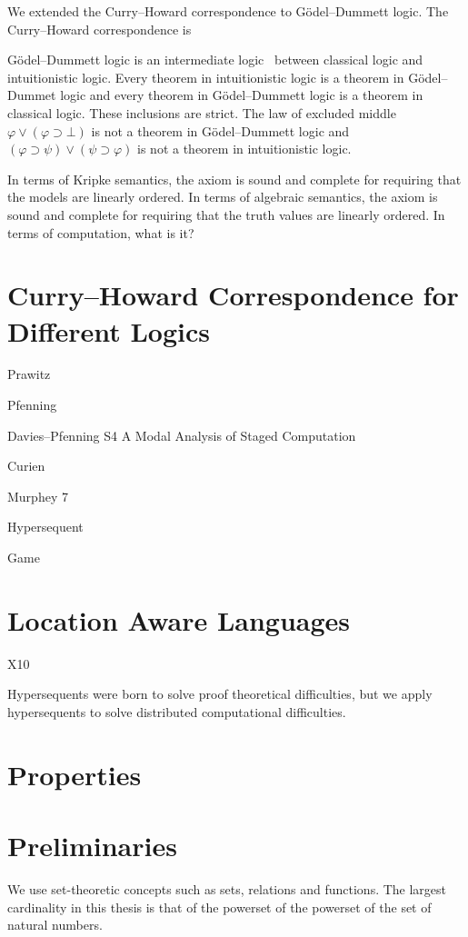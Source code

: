 We extended the Curry--Howard correspondence to G\"odel--Dummett logic.
The Curry--Howard correspondence is 

G\"odel--Dummett logic is an intermediate logic~\citep{umezawa} between
classical logic and intuitionistic logic.  Every theorem in
intuitionistic logic is a theorem in G\"odel--Dummet logic and every
theorem in G\"odel--Dummett logic is a theorem in classical logic.
These inclusions are strict.  The law of excluded middle
$\varphi\vee(\varphi\supset \bot)$ is not a theorem in G\"odel--Dummett
logic and $(\varphi\supset\psi)\vee(\psi\supset\varphi)$ is not a
theorem in intuitionistic logic.

In terms of Kripke semantics, the axiom is sound and complete for
requiring that the models are linearly ordered.
In terms of algebraic semantics, the axiom is sound and complete for
requiring that the truth values are linearly ordered.  
In terms of computation, what is it?

\section{Curry--Howard Correspondence for Different Logics}

Prawitz

Pfenning

Davies--Pfenning S4 A Modal Analysis of Staged Computation

Curien

Murphey 7

Hypersequent

Game

\section{Location Aware Languages}

X10


Hypersequents were born to solve proof theoretical difficulties, but we
apply hypersequents to solve distributed computational difficulties.

\section{Properties}


\section{Preliminaries}

We use set-theoretic concepts such as sets, relations and functions.
The largest cardinality in this thesis is that of the
powerset of the powerset of the set of natural numbers.